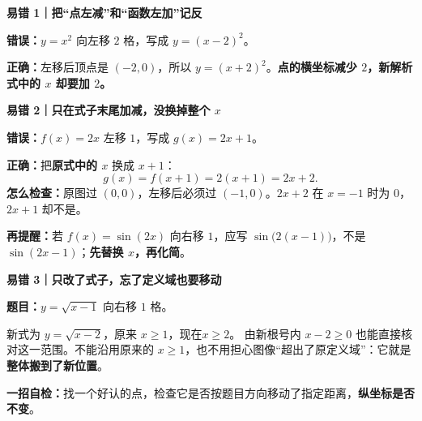 \begin{trapbox}
  \textbf{\textcolor{CTrap}{易错 1｜把“点左减”和“函数左加”记反}}

  \textbf{错误：}$y=x^2$ 向左移 $2$ 格，写成 $y=(x-2)^2$。

  \textbf{正确：}左移后顶点是 $(-2,0)$，所以 $y=(x+2)^2$。\textbf{点的横坐标减少 $2$，新解析式中的 $x$ 却要加 $2$。}
  \begin{center}
  
  \end{center}

  \medskip
  \textbf{\textcolor{CTrap}{易错 2｜只在式子末尾加减，没换掉整个 $x$}}

  \textbf{错误：}$f(x)=2x$ 左移 $1$，写成 $g(x)=2x+1$。

  \textbf{正确：}把\textbf{原式中的 $x$} 换成 $x+1$：
  \[
    g(x)=f(x+1)=2(x+1)=\boxed{2x+2}.
  \]
  \textbf{怎么检查：}原图过 $(0,0)$，左移后必须过 $(-1,0)$。$2x+2$ 在 $x=-1$ 时为 $0$，$2x+1$ 却不是。
  \begin{center}
  
  \end{center}
  \textbf{再提醒：}若 $f(x)=\sin(2x)$ 向右移 $1$，应写 $\sin\!\bigl(2(x-1)\bigr)$，不是 $\sin(2x-1)$；\textbf{先替换 $x$，再化简}。

  \medskip
  \textbf{\textcolor{CTrap}{易错 3｜只改了式子，忘了定义域也要移动}}

  \textbf{题目：}$y=\sqrt{x-1}$ 向右移 $1$ 格。

  新式为 $y=\sqrt{x-2}$，原来 $x\geqslant1$，现在\textbf{$x\geqslant2$}。
  由新根号内 $x-2\geqslant0$ 也能直接核对这一范围。不能沿用原来的 $x\geqslant1$，也不用担心图像“超出了原定义域”：它就是\textbf{整体搬到了新位置}。
  \begin{center}
  
  \end{center}

  \textbf{\textcolor{CTrap}{一招自检：}}找一个好认的点，检查它是否按题目方向移动了指定距离，\textbf{纵坐标是否不变}。
\end{trapbox}
